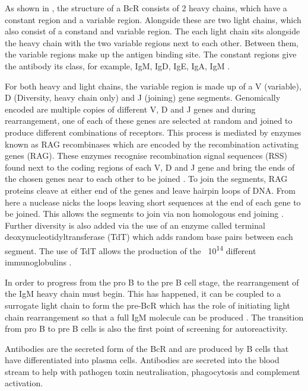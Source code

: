 As shown in , the structure of a BcR consists of 2 heavy chains, which have a constant region and a variable region.
Alongside these are two light chains, which also consist of a constand and variable region.
The each light chain sits alongside the heavy chain with the two variable regions next to each other.
Between them, the variable regions make up the antigen binding site.
The constant regions give the antibody its class, for example, IgM, IgD, IgE, IgA, IgM \citep{Pieper2013}.

For both heavy and light chains, the variable region is made up of a V (variable), D (Diversity, heavy chain only) and J (joining) gene segments. 
Genomically encoded are multiple copies of different V, D and J genes and during rearrangement, one of each of these genes are selected at random and joined to produce different combinations of receptors.
This process is mediated by enzymes known as RAG recombinases which are encoded by the recombination activating genes (RAG).
These enzymes recognise recombination signal sequences (RSS) found next to the coding regions of each V, D and J gene and bring the ends of the chosen genes near to each other to be joined \citep{Fugmann2014, Oettinger1999}.
To join the segments, RAG proteins cleave at either end of the genes and leave hairpin loops of DNA.
From here a nuclease nicks the loops leaving short sequences at the end of each gene to be joined.
This allows the segments to join via non homologous end joining \citep{Schatz2011}.
Further diversity is also added via the use of an enzyme called terminal deoxynucleotidyltransferase (TdT) which adds random base pairs between each segment.
The use of TdT allows the production of the ~10\textsuperscript{14} different immunoglobulins \citep{Motea2010}.

In order to progress from the pro B to the pre B cell stage, the rearrangement of the IgM heavy chain must begin.
This has happened, it can be coupled to a surrogate light chain to form the pre-BcR which has the role of initiating light chain rearrangement so that a full IgM molecule can be produced \citep{Burrows2002}.
The transition from pro B to pre B cells is also the first point of screening for autoreactivity\citep{Pieper2013}.

Antibodies are the secreted form of the BcR and are produced by B cells that have differentiated into plasma cells.
Antibodies are secreted into the blood stream to help with pathogen toxin neutralisation, phagocytosis and complement activation\citep{Janeway2008}.


